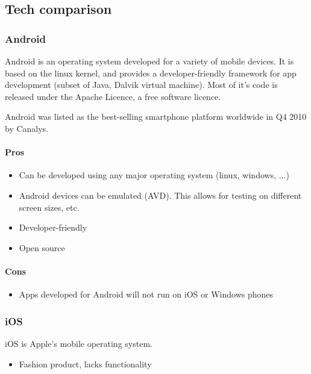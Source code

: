 \subsection{Tech comparison}

\subsubsection{Android}

	Android is an operating system developed for a variety of mobile devices.
	It is based on the linux kernel, and provides a developer-friendly
	framework for app development (subset of Java, Dalvik virtual machine).
	Most of it's code is released under the Apache Licence, a free software
	licence.

	Android was listed as the best-selling smartphone platform worldwide in Q4
	2010 by Canalys. \cite{wiki:android}

	\paragraph{Pros}
		\begin{itemize}
			\item Can be developed using any major operating system (linux, windows, ...)
			\item Android devices can be emulated (AVD). This allows for testing on
			different screen sizes, etc.
			\item Developer-friendly
			\item Open source
		\end{itemize}

	\paragraph{Cons}
		\begin{itemize}
			\item Apps developed for Android will not run on iOS or Windows phones
		\end{itemize}

\subsubsection{iOS}

	iOS is Apple's mobile operating system.

		\begin{itemize}
			\item Fashion product, lacks functionality
		\end{itemize}

